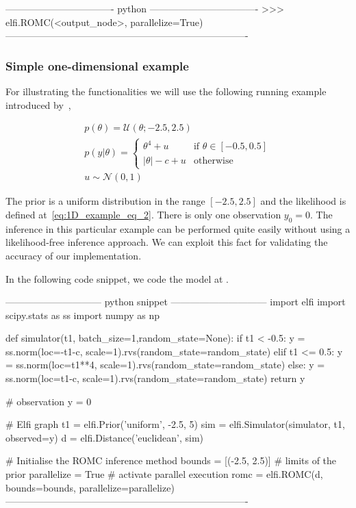 \begin{Code}
---------------------------------- python ----------------------------------
>>> elfi.ROMC(<output_node>, parallelize=True)
----------------------------------------------------------------------------
\end{Code}
  
\subsubsection*{Simple one-dimensional example}

For illustrating the functionalities we will use the following running
example introduced by~\cite{Ikonomov2019},

\begin{gather} \label{eq:1D_example}
  p(\theta) = \mathcal{U}(\theta;-2.5,2.5)\\ \label{eq:1D_example_eq_2}
  p(y|\theta) = \left\{
    \begin{array}{ll} \theta^4 + u & \mbox{if } \theta \in [-0.5, 0.5]
\\ |\theta| - c + u & \mbox{otherwise}
    \end{array} \right.\\ 
  u \sim \mathcal{N}(0,1)
\end{gather}

\noindent

The prior is a uniform distribution in the range $[-2.5, 2.5]$ and the
likelihood is defined at~\ref{eq:1D_example_eq_2}. There is only one
observation $y_0 = 0$. The inference in this particular example can be
performed quite easily without using a likelihood-free inference
approach. We can exploit this fact for validating the accuracy of our
implementation.

In the following code snippet, we code the model at .

\begin{Code}
------------------------------ python snippet ------------------------------
  import elfi import scipy.stats as ss
  import numpy as np

  def simulator(t1, batch_size=1,random_state=None):
    if t1 < -0.5:
        y = ss.norm(loc=-t1-c, scale=1).rvs(random_state=random_state)
    elif t1 <= 0.5:
        y = ss.norm(loc=t1**4, scale=1).rvs(random_state=random_state)
    else:
        y = ss.norm(loc=t1-c, scale=1).rvs(random_state=random_state)
    return y

  # observation
  y = 0
      
  # Elfi graph
  t1 = elfi.Prior('uniform', -2.5, 5)
  sim = elfi.Simulator(simulator, t1, observed=y)
  d = elfi.Distance('euclidean', sim)

  # Initialise the ROMC inference method
  bounds = [(-2.5, 2.5)] # limits of the prior
  parallelize = True # activate parallel execution
  romc = elfi.ROMC(d, bounds=bounds, parallelize=parallelize)
----------------------------------------------------------------------------
\end{Code}
